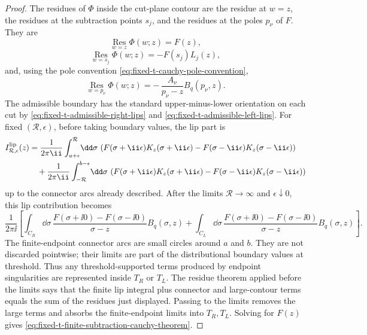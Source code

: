 \begin{proof}
The residues of \(\Phi\) inside the cut-plane contour are the residue at
\(w=z\), the residues at the subtraction points \(s_j\), and the residues at
the poles \(p_\nu\) of \(F\).  They are
\[
  \operatorname*{Res}_{w=z}\Phi(w;z)=F(z),
\]
\begin{equation}
  \operatorname*{Res}_{w=s_j}\Phi(w;z)
  =
  -F(s_j)L_j(z),
  \label{eq:fixed-t-cauchy-subtraction-residue}
\end{equation}
and, using the pole convention
\eqref{eq:fixed-t-cauchy-pole-convention},
\begin{equation}
  \operatorname*{Res}_{w=p_\nu}\Phi(w;z)
  =
  -\,\frac{A_\nu}{p_\nu-z}B_q(p_\nu,z).
  \label{eq:fixed-t-cauchy-stable-pole-residue}
\end{equation}
The admissible boundary has the standard upper-minus-lower orientation on
each cut by
\eqref{eq:fixed-t-admissible-right-lips} and
\eqref{eq:fixed-t-admissible-left-lips}.  For fixed
\((\mathcal R,\epsilon)\), before taking boundary values, the lip part is
\begin{align}
  I^{\rm lip}_{\mathcal R,\epsilon}(z)
  &=
  \frac{1}{2\pi\ii}
  \int_{a+\epsilon}^{\mathcal R}\!\dd\sigma\,
  \left(
  F(\sigma+\ii\epsilon)K_z(\sigma+\ii\epsilon)
  -
  F(\sigma-\ii\epsilon)K_z(\sigma-\ii\epsilon)
  \right)
  \nonumber\\
  &\quad+
  \frac{1}{2\pi\ii}
  \int_{-\mathcal R}^{b-\epsilon}\!\dd\sigma\,
  \left(
  F(\sigma+\ii\epsilon)K_z(\sigma+\ii\epsilon)
  -
  F(\sigma-\ii\epsilon)K_z(\sigma-\ii\epsilon)
  \right)
  \label{eq:fixed-t-cauchy-cut-lip-epsilon-integral}
\end{align}
up to the connector arcs already described.  After the limits
\(\mathcal R\to\infty\) and \(\epsilon\downarrow0\), this lip contribution
becomes
\begin{equation}
  \frac{1}{2\pi\ii}
  \left[
  \int_{C_R}\!\dd\sigma\,
  \frac{F(\sigma+\ii0)-F(\sigma-\ii0)}{\sigma-z}B_q(\sigma,z)
  +
  \int_{C_L}\!\dd\sigma\,
  \frac{F(\sigma+\ii0)-F(\sigma-\ii0)}{\sigma-z}B_q(\sigma,z)
  \right].
  \label{eq:fixed-t-cauchy-cut-boundary-integral}
\end{equation}
The finite-endpoint connector arcs are small circles around \(a\) and \(b\).
They are not discarded pointwise; their limits are part of the
distributional boundary values at threshold.  Thus any threshold-supported
terms produced by endpoint singularities are represented inside \(T_R\) or
\(T_L\).
The residue theorem applied before the limits says that the finite lip
integral plus connector and large-contour terms equals the sum of the
residues just displayed.  Passing to the limits removes the large terms and
absorbs the finite-endpoint limits into \(T_R,T_L\).  Solving for \(F(z)\)
gives \eqref{eq:fixed-t-finite-subtraction-cauchy-theorem}.


\end{proof}
